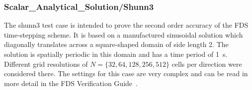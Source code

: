 

\subsubsection{Scalar\_Analytical\_Solution/Shunn3}

The {\ct shunn3} test case is intended to prove the second order accuracy of the FDS time-stepping scheme. It is based on a manufactured sinusoidal solution which diagonally translates across a square-shaped domain of side length 2. The solution is spatially periodic in this domain and has a time period of 1~s. 
Different grid resolutions of  $N = \{32, 64, 128, 256, 512\}$ cells per direction were considered there. 
The settings for this case are very complex and can be read in more detail in the FDS Verification Guide~\cite{McGrattan:2018:VG}.

